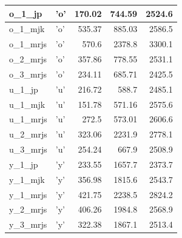 \documentclass[a4paper, 12pt, titlepage]{article}
\begin{document}
\begin{table}[H]
\begin{tabular}{|l|l|r|r|r|}
                o\_1\_jp & 'o' & 170.02 & 744.59 & 2524.6 \\ \hline
                o\_1\_mjk & 'o' & 535.37 & 885.03 & 2586.5 \\ \hline
                o\_1\_mrjs & 'o' & 570.6 & 2378.8 & 3300.1 \\ \hline
                o\_2\_mrjs & 'o' & 357.86 & 778.55 & 2531.1 \\ \hline
                o\_3\_mrjs & 'o' & 234.11 & 685.71 & 2425.5 \\ \hline
                u\_1\_jp & 'u' & 216.72  & 588.7 & 2485.1 \\ \hline
                u\_1\_mjk & 'u' & 151.78 & 571.16 & 2575.6 \\ \hline
                u\_1\_mrjs & 'u' & 272.5 & 573.01 & 2606.6 \\ \hline
                u\_2\_mrjs & 'u' & 323.06 & 2231.9 & 2778.1 \\ \hline
                u\_3\_mrjs & 'u' & 254.24 & 667.9 & 2508.9 \\ \hline
                y\_1\_jp & 'y' & 233.55 & 1657.7 & 2373.7 \\ \hline
                y\_1\_mjk & 'y' & 356.98 & 1815.6 & 2543.7 \\ \hline
                y\_1\_mrjs & 'y' & 421.75 & 2238.5 & 2824.2 \\ \hline
                y\_2\_mrjs & 'y' & 406.26 & 1984.8 & 2568.9 \\ \hline
                y\_3\_mrjs & 'y' & 322.38 & 1867.1 & 2513.4 \\ \hline
            \end{tabular}
        \end{table}
\end{document}
